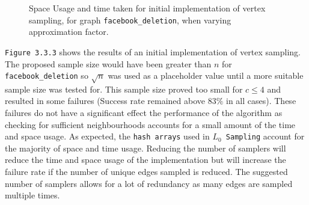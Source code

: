 \documentclass[11pt,twoside,a4paper]{report}
\begin{document}

\begin{figure}[H]
	\label{Figure 15}
	\caption{Space Usage and time taken for initial implementation of vertex sampling, for graph \texttt{facebook\_deletion}, when varying approximation factor.}
\end{figure}

\texttt{Figure 3.3.3} shows the results of an initial implementation of vertex sampling. The proposed sample size would have been greater than $n$ for \texttt{facebook\_deletion} so $\sqrt{n}$ was used as a placeholder value until a more suitable sample size was tested for. This sample size proved too small for $c\leq4$ and resulted in some failures (Success rate remained above $83\%$ in all cases). These failures do not have a significant effect the performance of the algorithm as checking for sufficient neighbourhoods accounts for a small amount of the time and space usage. As expected, the \texttt{hash arrays} used in \texttt{$L_0$ Sampling} account for the majority of space and time usage. Reducing the number of samplers will reduce the time and space usage of the implementation but will increase the failure rate if the number of unique edges sampled is reduced. The suggested number of samplers allows for a lot of redundancy as many edges are sampled multiple times.
\end{document}
